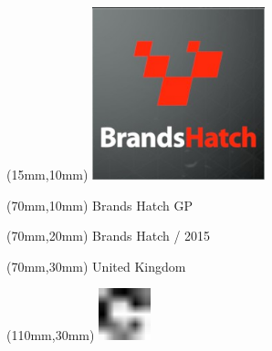 \null\newpage
\begin{textblock*}{50mm}(15mm,10mm)%
\includegraphics[width=50mm]{LG/2015-05-20_00074.png}
\end{textblock*}
\begin{textblock*}{130mm}(70mm,10mm)%
{\fontsize{20}{20}\selectfont Brands Hatch GP}\\
\end{textblock*}
\begin{textblock*}{120mm}(70mm,20mm)%
{\fontsize{16}{16}\selectfont Brands Hatch / 2015}\\
\end{textblock*}
\begin{textblock*}{120mm}(70mm,30mm)%
{\fontsize{12}{12}\selectfont United Kingdom}
\end{textblock*}
\begin{textblock*}{30mm}(110mm,30mm)%
\centering
\includegraphics[height=15mm]{icons/fa-rotate-right.pdf}
\end{textblock*}

